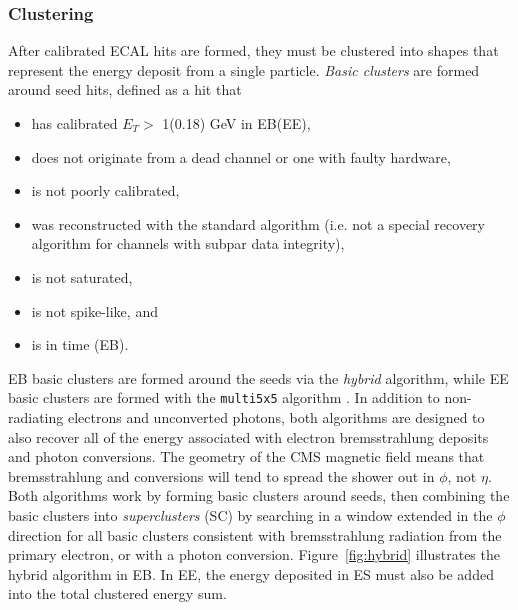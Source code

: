 \documentclass[dissertation.tex]{subfiles}
\begin{document}
\subsubsection{Clustering}
\label{sec:Clustering}

After calibrated ECAL hits are formed, they must be clustered into shapes that represent the energy deposit from a single particle.  \textit{Basic clusters} are formed around seed hits, defined as a hit that

\begin{itemize}
\item has calibrated $E_{T} >$ 1(0.18) GeV in EB(EE),
\item does not originate from a dead channel or one with faulty hardware,
\item is not poorly calibrated,
\item was reconstructed with the standard algorithm (i.e. not a special recovery algorithm for channels with subpar data integrity),
\item is not saturated,
\item is not spike-like, and
\item is in time (EB).
\end{itemize}
%
EB basic clusters are formed around the seeds via the \textit{hybrid} algorithm, while EE basic clusters are formed with the \verb+multi5x5+ algorithm \cite{ECAL_SC_note}.  In addition to non-radiating electrons and unconverted photons, both algorithms are designed to also recover all of the energy associated with electron bremsstrahlung deposits and photon conversions.  The geometry of the CMS magnetic field means that bremsstrahlung and conversions will tend to spread the shower out in $\phi$, not $\eta$.  Both algorithms work by forming basic clusters around seeds, then combining the basic clusters into \textit{superclusters} (SC) by searching in a window extended in the $\phi$ direction for all basic clusters consistent with bremsstrahlung radiation from the primary electron, or with a photon conversion.  Figure~\ref{fig:hybrid} illustrates the hybrid algorithm in EB.  In EE, the energy deposited in ES must also be added into the total clustered energy sum.
\end{document}
